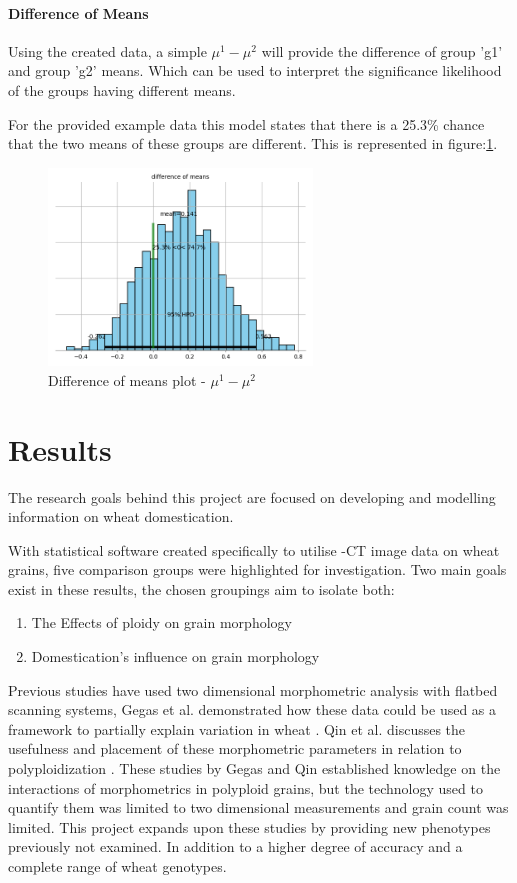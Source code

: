 \documentclass[11pt]{report}
\begin{document}
\subsubsection{Difference of Means}
\label{sec:orge6e9544}
Using the created data, a simple \(\mu^1 - \mu^2\) will provide the difference of group 'g1' and group 'g2' means. Which can be used to interpret the significance likelihood of the groups having different means.

For the provided example data this model states that there is a 25.3\% chance that the two means of these groups are different. This is represented in figure:\ref{fig:orgbf2cf9b}.
\begin{figure}[htbp]
\centering
\includegraphics[width=7cm]{./images/examplebayes2.png}
\caption{\label{fig:orgbf2cf9b}
Difference of means plot - \(\mu^1 - \mu^2\)}
\end{figure}



\chapter{Results}
\label{sec:org281e806}
The research goals behind this project are focused on developing and modelling information on wheat domestication.

With statistical software created specifically to utilise \textmu{}-CT image data on wheat grains, five comparison groups were highlighted for investigation. Two main goals exist in these results, the chosen groupings aim to isolate both:

\begin{enumerate}
\item The Effects of ploidy on grain morphology
\item Domestication's influence on grain morphology
\end{enumerate}

Previous studies have used two dimensional morphometric analysis with flatbed scanning systems, Gegas et al. demonstrated  how these data could be used as a framework to partially explain variation in wheat \cite{Gegas2010}.  Qin et al. discusses the usefulness and placement of these morphometric parameters in relation to polyploidization \cite{Qin2017}. These studies by Gegas and Qin established knowledge on the interactions of morphometrics in polyploid grains, but the technology used to quantify them was limited to two dimensional measurements and grain count was limited.  This project expands upon these studies by providing new phenotypes previously not examined. In addition to a higher degree of accuracy and a complete range of wheat genotypes.
\end{document}
